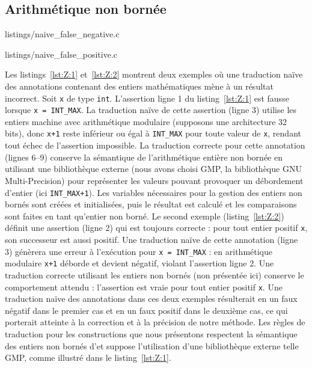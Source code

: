 \subsection{Arithmétique non bornée}
\label{sec:integers}



                {listings/naive_false_negative.c}


                {listings/naive_false_positive.c}


Les listings~\ref{lst:Z:1} et~\ref{lst:Z:2} montrent deux exemples où
une traduction naïve des annotations contenant des entiers mathématiques mène
à un résultat incorrect.
Soit \lstinline'x' de type \lstinline'int'.
L'assertion ligne 1 du listing~\ref{lst:Z:1} est fausse lorsque
\lstinline'x = INT_MAX'.
La traduction naïve de cette assertion (ligne 3) utilise les entiers machine
avec arithmétique modulaire (supposons une architecture 32 bits), donc
\lstinline'x+1' reste inférieur ou égal à \lstinline'INT_MAX' pour toute valeur
de \lstinline'x', rendant tout échec de l'assertion impossible.
La traduction correcte pour cette annotation (lignes 6--9) conserve la
sémantique de l'arithmétique entière non bornée en utilisant une bibliothèque
externe (nous avons choisi GMP, la bibliothèque GNU Multi-Precision) pour
représenter les valeurs pouvant provoquer un débordement d'entier (ici
\lstinline'INT_MAX+1').
Les variables nécessaires pour la gestion des entiers non bornés sont créées et
initialisées, puis le résultat est calculé et les comparaisons sont faites en
tant qu'entier non borné.
Le second exemple (listing~\ref{lst:Z:2}) définit une assertion \eacsl (ligne 2)
qui est toujours correcte : pour tout entier positif \lstinline'x', son
successeur est aussi positif.
Une traduction naïve de cette annotation (ligne 3) génèrera une erreur à
l'exécution pour \lstinline'x = INT_MAX' : en arithmétique modulaire
\lstinline'x+1' déborde et devient négatif, violant l'assertion ligne 2.
Une traduction correcte utilisant les entiers non bornés (non présentée ici)
conserve le comportement attendu : l'assertion est vraie pour tout entier
positif \lstinline'x'.
Une traduction naïve des annotations dans ces deux exemples résulterait en un
faux négatif dans le premier cas et en un faux positif dans le deuxième cas, ce
qui porterait atteinte à la correction et à la précision de notre méthode.
Les règles de traduction pour les constructions \eacsl que nous présentons
respectent la sémantique des entiers non bornés d'\eacsl et suppose
l'utilisation d'une bibliothèque externe telle GMP, comme illustré dans le
listing~\ref{lst:Z:1}.



